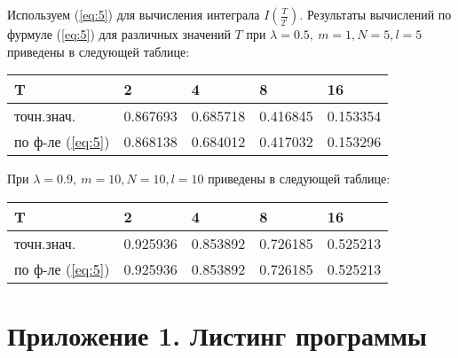\documentclass [12pt]{report}
\begin{document}
Используем (\ref{eq:5}) для вычисления интеграла $I(\frac{T}{2^l})$.
Результаты вычислений по фурмуле (\ref{eq:5}) для
различных значений $T$ при $\lambda=0.5,~m=1, N=5, l=5$
приведены в следующей таблице:
\begin{center}
\begin{tabular}{ | m{3cm} | m{2cm}| m{2cm} | m{2cm} | m{2cm} | }
\hline
 T & 2 & 4 & 8 & 16 \\
\hline
 точн.знач. & 0.867693 & 0.685718 & 0.416845 & 0.153354 \\
 по ф-ле (\ref{eq:5}) & 0.868138 & 0.684012 & 0.417032 & 0.153296 \\
\hline
\end{tabular}
\end{center}

При $\lambda=0.9,~m=10, N=10, l=10$
приведены в следующей таблице:
\begin{center}
\begin{tabular}{ | m{3cm} | m{2cm}| m{2cm} | m{2cm} | m{2cm} | }
\hline
 T & 2 & 4 & 8 & 16 \\
\hline
 точн.знач. & 0.925936 & 0.853892 & 0.726185 & 0.525213 \\
 по ф-ле (\ref{eq:5}) & 0.925936 & 0.853892 & 0.726185 & 0.525213 \\
\hline
\end{tabular}
\end{center}

\chapter*{Приложение 1. Листинг программы}
\end{document}
